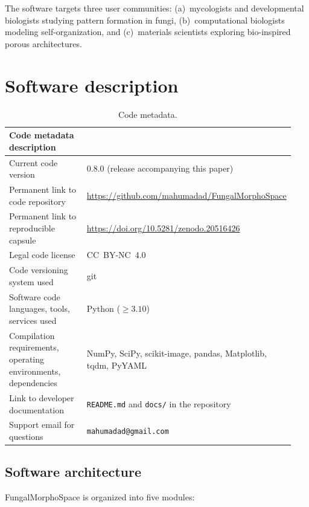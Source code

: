 \documentclass[review,3p]{elsarticle}
\begin{document}
The software targets three user communities: (a)~mycologists and
developmental biologists studying pattern formation in fungi,
(b)~computational biologists modeling self-organization, and
(c)~materials scientists exploring bio-inspired porous architectures.


\section{Software description}
\label{sec:description}

\begin{table}[ht]
\centering
\caption{Code metadata.}
\label{tab:codemeta}
\begin{tabular}{@{}p{0.46\linewidth}p{0.48\linewidth}@{}}
\toprule
\textbf{Code metadata description} & \\
\midrule
Current code version & 0.8.0 (release accompanying this paper) \\
Permanent link to code repository & \url{https://github.com/mahumadad/FungalMorphoSpace} \\
Permanent link to reproducible capsule & \url{https://doi.org/10.5281/zenodo.20516426} \\
Legal code license & CC~BY-NC~4.0 \\
Code versioning system used & git \\
Software code languages, tools, services used & Python ($\geq 3.10$) \\
Compilation requirements, operating environments, dependencies & NumPy, SciPy, scikit-image, pandas, Matplotlib, tqdm, PyYAML \\
Link to developer documentation & \texttt{README.md} and \texttt{docs/} in the repository \\
Support email for questions & \texttt{mahumadad@gmail.com} \\
\bottomrule
\end{tabular}
\end{table}

\subsection{Software architecture}
\label{sec:architecture}

FungalMorphoSpace is organized into five modules:
\end{document}

